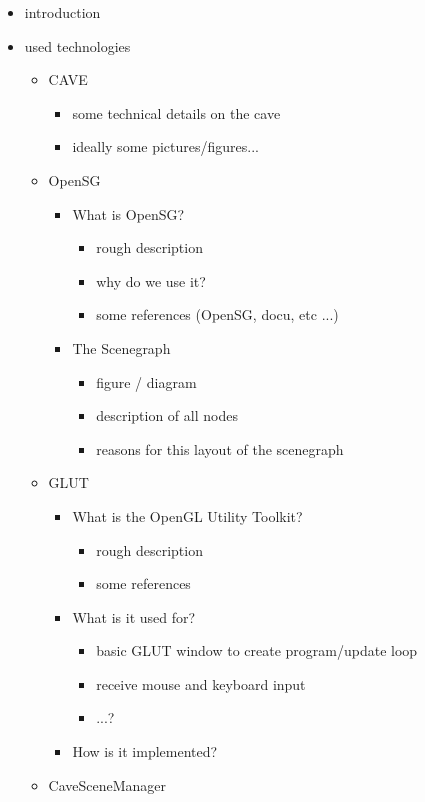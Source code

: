 \documentclass[conference]{acmsiggraph}
\begin{document}
\begin{itemize}
\item introduction
\item{used technologies
	\begin{itemize}
	\item{CAVE
		\begin{itemize}
		\item some technical details on the cave
		\item ideally some pictures/figures...
		\end{itemize}
	}
	\item{OpenSG
		\begin{itemize}
		\item{ What is OpenSG?
			\begin{itemize}
			\item rough description
			\item why do we use it?
			\item some references (OpenSG, docu, etc ...)
			\end{itemize}
		}
		\item{The Scenegraph
			\begin{itemize}
			\item figure / diagram
			\item description of all nodes
			\item reasons for this layout of the scenegraph
			\end{itemize}
		}
		\end{itemize}
	}
	\item{GLUT
		\begin{itemize}
		\item{What is the OpenGL Utility Toolkit?
			\begin{itemize}
			\item rough description
			\item some references
			\end{itemize}
		}
		\item{What is it used for?
			\begin{itemize}
			\item basic GLUT window to create program/update loop
			\item receive mouse and keyboard input
			\item ...?
			\end{itemize}
		}
		\item How is it implemented?
		\end{itemize}
	}
	\item{CaveSceneManager
}
\end{itemize}}
\end{itemize}
\end{document}
